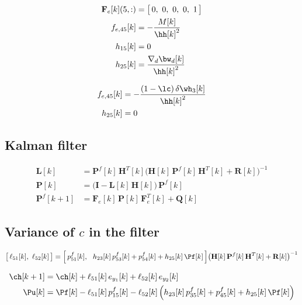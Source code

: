 \[
\begin{aligned}
\mathbf{F}_e[k](5,:) &= \big[\,0,\ 0,\ 0,\ 0,\ 1\,\big] \\
f_{e,45}[k] &= -\frac{M[k]}{\hh[k]^{2}} \\
h_{15}[k] &= 0 \\
h_{25}[k] &= \frac{\nabla_d\bw_d[k]}{\hh[k]^{2}}
\end{aligned}
\]

\[
\begin{aligned}
f_{e,45}[k] &= -\frac{(1-\lc)\,\delta\wh_3[k]}{\hh[k]^{2}} \\
h_{25}[k] &= 0
\end{aligned}
\]

\subsection{Kalman filter}

\[
\begin{aligned}
\mathbf{L}[k] &= \mathbf{P}^{f}[k]\,\mathbf{H}^{T}[k]\big(\mathbf{H}[k]\,\mathbf{P}^{f}[k]\,\mathbf{H}^{T}[k] + \mathbf{R}[k]\big)^{-1} \\
\mathbf{P}[k] &= \big(\mathbf{I} - \mathbf{L}[k]\,\mathbf{H}[k]\big)\,\mathbf{P}^{f}[k] \\
\mathbf{P}^{f}[k+1] &= \mathbf{F}_e[k]\,\mathbf{P}[k]\,\mathbf{F}_e^{T}[k] + \mathbf{Q}[k]
\end{aligned}
\]

\subsection{Variance of $c$ in the filter}

\[
\big[\,\ell_{51}[k],\ \ell_{52}[k]\,\big]
= \Big[\,p^{f}_{51}[k],\ \ h_{23}[k]\,p^{f}_{53}[k] + p^{f}_{54}[k] + h_{25}[k]\,\Pf[k]\,\Big]
\big(\mathbf{H}[k]\,\mathbf{P}^{f}[k]\,\mathbf{H}^{T}[k] + \mathbf{R}[k]\big)^{-1}
\]

\[
\begin{aligned}
\ch[k+1] &= \ch[k] + \ell_{51}[k]\,e_{y_1}[k] + \ell_{52}[k]\,e_{y_2}[k] \\
\Pu[k] &= \Pf[k] - \ell_{51}[k]\,p^{f}_{15}[k] - \ell_{52}[k]\,\Big(h_{23}[k]\,p^{f}_{35}[k] + p^{f}_{45}[k] + h_{25}[k]\,\Pf[k]\Big)
\end{aligned}
\]


